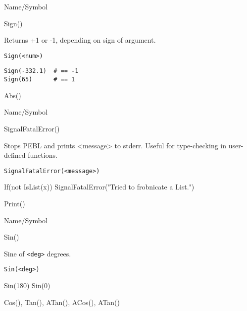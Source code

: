 \begin{desc}{Name/Symbol}
\item[Name/Symbol] 	Sign()

\item[Description] 	Returns +1 or -1, depending on sign of argument.

\item[Usage]
\begin{verbatim}
Sign(<num>)
\end{verbatim}

\item[Example]
\begin{verbatim}
Sign(-332.1)  # == -1
Sign(65)      # == 1

\end{verbatim}

\item[See Also]     	Abs()
\end{desc}

\rl


\begin{desc}{Name/Symbol}
\item[Name/Symbol] 	SignalFatalError()

\item[Description] 	Stops PEBL and prints <message> to stderr.  Useful for
		type-checking in user-defined functions. 

\item[Usage]
\begin{verbatim}
SignalFatalError(<message>)
\end{verbatim}
If(not IsList(x))
{
 SignalFatalError("Tried to frobnicate a List.")
}
\item[Example]

\item[See Also]     	Print()
\end{desc}

\rl


\begin{desc}{Name/Symbol}
\item[Name/Symbol]  	Sin()

\item[Description]  	Sine of \verb+<deg>+ degrees.

\item[Usage]        	
\begin{verbatim}
Sin(<deg>)
\end{verbatim}
Sin(180)
Sin(0)
\item[Example]

\item[See Also]    	Cos(), Tan(), ATan(), ACos(), ATan() 
\end{desc}

